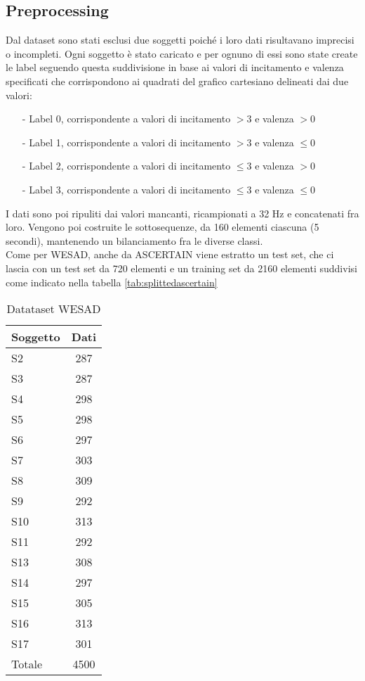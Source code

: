 \subsection{Preprocessing}
Dal dataset sono stati esclusi due soggetti poiché i loro dati risultavano imprecisi o incompleti. Ogni soggetto è stato caricato e per ognuno di essi sono state create le label seguendo questa suddivisione in base ai valori di incitamento e valenza specificati che corrispondono ai quadrati del grafico cartesiano delineati dai due valori:
\begin{itemize}
    \item[-] Label 0, corrispondente a valori di incitamento $> 3$ e valenza $> 0$
    \item[-] Label 1, corrispondente a valori di incitamento $> 3$ e valenza $\leq 0$
    \item[-] Label 2, corrispondente a valori di incitamento $\leq 3$ e valenza $> 0$
    \item[-] Label 3, corrispondente a valori di incitamento $\leq 3$ e valenza $\leq 0$
\end{itemize}
I dati sono poi ripuliti dai valori mancanti, ricampionati a 32 Hz e concatenati fra loro. Vengono poi costruite le sottosequenze, da 160 elementi ciascuna (5 secondi), mantenendo un bilanciamento fra le diverse classi.\\
Come per WESAD, anche da ASCERTAIN viene estratto un test set, che ci lascia con un test set da 720 elementi e un training set da 2160 elementi suddivisi come indicato nella tabella \ref{tab:splittedascertain}
\begin{table}[h]
	\begin{center}
		\begin{tabular}{l|c}
		     \textbf{Soggetto} & \textbf{Dati}\\
		     \hline
		     S2 & 287 \\
		     S3 & 287 \\
		     S4 & 298 \\
		     S5 & 298 \\
		     S6 & 297 \\
		     S7 & 303 \\
		     S8 & 309 \\
		     S9 & 292 \\
		     S10 & 313 \\
		     S11 & 292 \\
		     S13 & 308 \\
		     S14 & 297 \\
		     S15 & 305 \\
		     S16 & 313 \\
		     S17 & 301 \\
		     \hline
		     Totale & 4500
		\end{tabular}
		\caption{Datataset WESAD}
		\label{tab:splittedwesad}
	\end{center}
\end{table}
